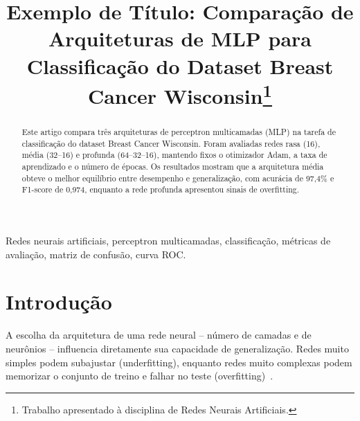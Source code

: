 \documentclass[conference]{IEEEtran}
\begin{document}
\title{Exemplo de Título: Comparação de Arquiteturas de MLP para
Classificação do Dataset Breast Cancer Wisconsin\thanks{Trabalho
apresentado à disciplina de Redes Neurais Artificiais.}}

\author{
\and
{}
\and
{}
}

\maketitle

\begin{abstract}
Este artigo compara três arquiteturas de perceptron multicamadas (MLP)
na tarefa de classificação do dataset Breast Cancer Wisconsin. Foram
avaliadas redes rasa (16), média (32--16) e profunda (64--32--16),
mantendo fixos o otimizador Adam, a taxa de aprendizado e o número de
épocas. Os resultados mostram que a arquitetura média obteve o melhor
equilíbrio entre desempenho e generalização, com acurácia de 97,4\% e
F1-score de 0,974, enquanto a rede profunda apresentou sinais de
overfitting.
\end{abstract}

\begin{IEEEkeywords}
Redes neurais artificiais, perceptron multicamadas, classificação,
métricas de avaliação, matriz de confusão, curva ROC.
\end{IEEEkeywords}

\section{Introdução}
A escolha da arquitetura de uma rede neural -- número de camadas e de
neurônios -- influencia diretamente sua capacidade de generalização.
Redes muito simples podem subajustar (underfitting), enquanto redes
muito complexas podem memorizar o conjunto de treino e falhar no teste
(overfitting)~\cite{goodfellow2016deep}.
\end{document}
